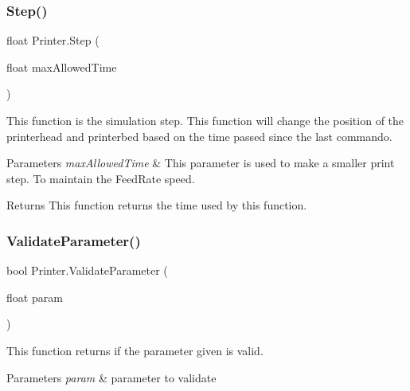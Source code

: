 \subsubsection{\texorpdfstring{Step()}{Step()}}
{\footnotesize\ttfamily float Printer.\+Step (\begin{DoxyParamCaption}\item[{float}]{max\+Allowed\+Time }\end{DoxyParamCaption})\hspace{0.3cm}{\ttfamily [private]}}



This function is the simulation step. This function will change the position of the printerhead and printerbed based on the time passed since the last commando. 


\begin{DoxyParams}{Parameters}
{\em max\+Allowed\+Time} & This parameter is used to make a smaller print step. To maintain the Feed\+Rate speed.\\
\hline
\end{DoxyParams}
\begin{DoxyReturn}{Returns}
This function returns the time used by this function.
\end{DoxyReturn}
\mbox{\label{class_printer_a2c8c5ca69f0633a9509ff69b03e6406f}} 
\subsubsection{\texorpdfstring{Validate\+Parameter()}{ValidateParameter()}}
{\footnotesize\ttfamily bool Printer.\+Validate\+Parameter (\begin{DoxyParamCaption}\item[{float}]{param }\end{DoxyParamCaption})\hspace{0.3cm}{\ttfamily [private]}}



This function returns if the parameter given is valid. 


\begin{DoxyParams}{Parameters}
{\em param} & parameter to validate\\
\hline
\end{DoxyParams}
\mbox{\label{class_printer_ab3c07108e5f5d6f7a7fcfaea556988fc}} 
